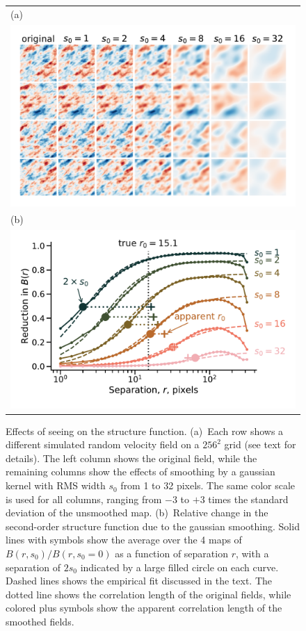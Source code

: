 \documentclass[fleqn,usenatbib, useAMS, a4paper]{mnras}
\begin{document}
\begin{figure}
  \begin{tabular}{@{} l @{}}
    (a)\\
    \includegraphics[width=\linewidth]{Figures/fake-seeing-nonp-thumbnails}\\
    (b)\\
    \includegraphics[width=\linewidth]{Figures/fake-seeing-nonp-reduction}
  \end{tabular}
  \caption{Effects of seeing on the structure function.
    (a)~Each row shows a different simulated random velocity field on a \(256^2\) grid
    (see text for details).
    The left column shows the original field,
    while the remaining columns show the effects of smoothing by a gaussian kernel
    with RMS width \(s_0\) from 1 to 32 pixels.
    The same color scale is used for all columns, ranging from \(-3\) to \(+3\) times
    the standard deviation of the unsmoothed map.
    (b)~Relative change in the second-order structure function due to the gaussian smoothing.
    Solid lines with symbols show the average over the 4 maps of
    \(B(r, s_0) / B(r, s_0 = 0)\) as a function of separation \(r\),
    with a separation of \(2 s_0\) indicated by a large filled circle on each curve.
    Dashed lines shows the empirical fit discussed in the text.
    The dotted line shows the correlation length of the original fields,
    while colored plus symbols show the apparent correlation length of the smoothed fields.
  }
  \label{fig:seeing-reduction}
\end{figure}



\bsp	%
\label{lastpage}
\end{document}
